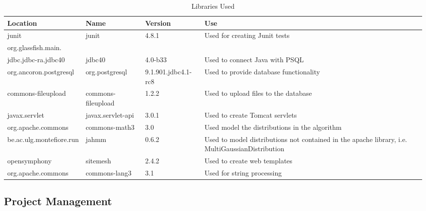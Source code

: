 \documentclass[11pt]{article}
\begin{document}
\begin{table}[htdp]
\caption{Libraries Used}
\begin{center}
\begin{tabular}{|p{4cm}|p{3cm}|p{3cm}|p{6cm}|}
Location & Name & Version & Use \\
\hline
junit                                   & junit               & 4.8.1               & Used for creating Junit tests \\
org.glassfish.main.\\jdbc.jdbc-ra.jdbc40  & jdbc40            & 4.0-b33             & Used to connect Java with PSQL \\
org.ancoron.postgresql                  & org.postgresql      & 9.1.901.jdbc4.1-rc8 & Used to provide database functionality \\
commons-fileupload                      & commons-fileupload  & 1.2.2               & Used to upload files to the database \\
javax.servlet                           & javax.servlet-api   & 3.0.1               & Used to create Tomcat servlets \\
org.apache.commons                      & commons-math3       & 3.0                 & Used model the distributions in the algorithm \\
be.ac.ulg.montefiore.run                & jahmm               & 0.6.2               & Used to model distributions not contained in the apache library, i.e. MultiGaussianDistribution \\
opensymphony                            & sitemesh            & 2.4.2               & Used to create web templates \\ 
org.apache.commons                      & commons-lang3       & 3.1                 & Used for string processing 

\end{tabular}
\end{center}
\label{libs}
\end{table}

\subsection{Project Management}
\end{document}

